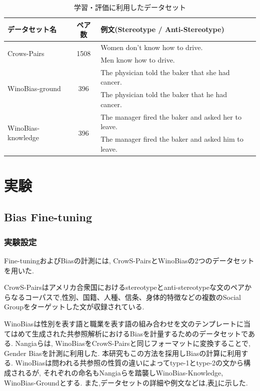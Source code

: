 \documentclass[
  platex, dvipdfmx %
]{nlp2021}
\begin{document}
\begin{table}[h]
\centering
\caption{学習・評価に利用したデータセット}
\label{tab:datasets}
\begin{tabular}{lcll}
\hline
データセット名 & ペア数 & 例文(Stereotype / Anti-Stereotype) \\
\hline
\multirow{2}{*}{Crows-Pairs} & \multirow{2}{*}{1508} & Women don't know how to drive.\\
 & & Men know how to drive. \\
\hline
\multirow{2}{*}{WinoBias-ground} & \multirow{2}{*}{396} & The physician told the baker that she had cancer.\\
 & & The physician told the baker that he had cancer. \\
\hline
\multirow{2}{*}{WinoBias-knowledge} & \multirow{2}{*}{396} & The manager fired the baker and asked her to leave.\\
 & & The manager fired the baker and asked him to leave. \\
\hline
\end{tabular}
\end{table}

\section{実験}
\subsection{Bias Fine-tuning}
\subsubsection{実験設定}
Fine-tuningおよびBiasの計測には, CrowS-Pairs\cite{nangia2020crows}とWinoBias\cite{zhao-etal-2018-gender}の2つのデータセットを用いた.


CrowS-Pairsはアメリカ合衆国におけるstereotypeとanti-stereotypeな文のペアからなるコーパスで,性別、国籍、人種、信条、身体的特徴などの複数のSocial Groupをターゲットした文が収録されている.

WinoBiasは性別を表す語と職業を表す語の組み合わせを文のテンプレートに当てはめて生成された共参照解析におけるBiasを計量するためのデータセットである. Nangiaら\cite{nangia2020crows}は, WinoBiasをCrowS-Pairsと同じフォーマットに変換することで, Gender Biasを計測に利用した. 本研究もこの方法を採用しBiasの計算に利用する. WinoBiasは問われる共参照の性質の違いによってtype-1とtype-2の文から構成されるが, それぞれの命名もNangiaらを踏襲しWinoBias-Knowledge, WinoBias-Groundとする.
また,データセットの詳細や例文などは,表\ref{tab:datasets}に示した.
\end{document}
